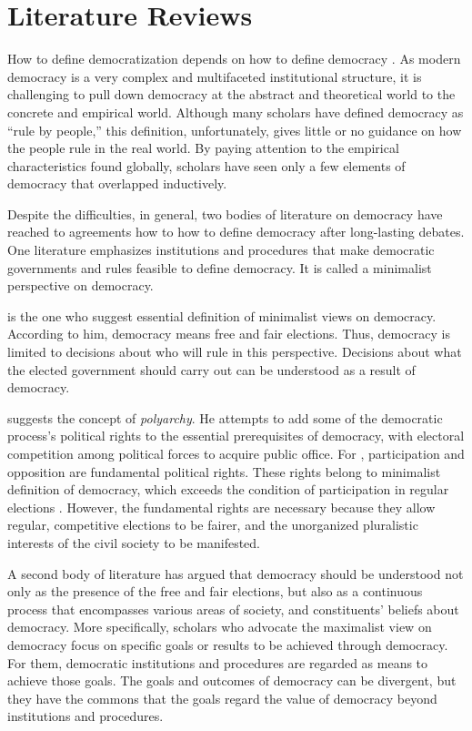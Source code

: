 \documentclass[11pt]{article}
\begin{document}
\section*{Literature Reviews}

How to define democratization depends on how to define democracy
\citep[797]{Treisman2020}. As modern democracy is a very complex and multifaceted institutional structure, it is challenging to pull down democracy at the abstract and theoretical world to the concrete and empirical world. Although many scholars have defined democracy as ``rule by people,'' this definition, unfortunately, gives little or no guidance on how the people rule in the real world. By paying attention to the empirical characteristics found globally, scholars have seen only a few elements of democracy that overlapped inductively.

Despite the difficulties, in general, two bodies of literature on
democracy have reached to agreements how to how to define democracy after long-lasting debates. One literature emphasizes institutions and procedures that make democratic governments and rules feasible to define democracy. It is called a minimalist perspective on democracy. 

\citet{Schumpeter1954} is the one who suggest essential definition of minimalist views on democracy. According to him, democracy means free and fair elections. Thus, democracy is limited to decisions about who will rule in this perspective. Decisions about what the elected government should carry out can be understood as a result of democracy.

\citet{Dahl1971} suggests the concept of \emph{polyarchy}. He attempts to add some of the democratic process's political rights to the essential prerequisites of democracy, with electoral competition among political forces to acquire public office. For \citet{Dahl1971}, participation and opposition are fundamental political rights. These rights belong to minimalist definition of democracy, which exceeds the condition of participation in regular elections \citep{przeworski2000}. However, the fundamental rights are necessary because they allow regular, competitive elections to be fairer, and the unorganized
pluralistic interests of the civil society to be manifested.

A second body of literature has argued that democracy should be
understood not only as the presence of the free and fair elections, but also as a continuous process that encompasses various areas of society, and constituents' beliefs about democracy. More specifically, scholars who advocate the maximalist view on democracy focus on specific goals or results to be achieved through democracy. For them, democratic institutions and procedures are regarded as means to achieve those goals. The goals and outcomes of democracy can be divergent, but they have the commons that the goals regard the value of democracy beyond institutions and procedures.
\end{document}
